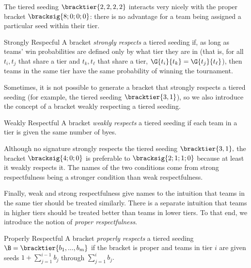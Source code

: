 {    The tiered seeding $\bracktier{2,2,2,2}$ interacts very nicely with the proper bracket $\bracksig{8;0;0;0}$: there is no advantage for a team being assigned a particular seed within their tier.

    \begin{definition}{Strongly Respecful}{}
        A bracket \textit{strongly respects} a tiered seeding if, as long as teams' win probabilities are defined only by what tier they are in (that is, for all $t_i, t_j$ that share a tier and $t_k, t_\ell$ that share a tier, $\G{t_i}{t_k} = \G{t_j}{t_\ell}$), then teams in the same tier have the same probability of winning the tournament.
    \end{definition}

    Sometimes, it is not possible to generate a bracket that strongly respects a tiered seeding (for example, the tiered seeding $\bracktier{3, 1}$), so we also introduce the concept of a bracket weakly respecting a tiered seeding.

    \begin{definition}{Weakly Respectful}{}
        A bracket \textit{weakly respects} a tiered seeding if each team in a tier is given the same number of byes.
    \end{definition}

    Although no signature strongly respects the tiered seeding $\bracktier{3, 1},$ the bracket $\bracksig{4;0;0}$ is preferable to $\bracksig{2;1;1;0}$ because at least it weakly respects it. The names of the two conditions come from strong respectfulness being a stronger condition than weak respectfulness.


    Finally, weak and strong respectfulness give names to the intuition that teams in the same tier should be treated similarly. There is a separate intuition that teams in higher tiers should be treated better than teams in lower tiers. To that end, we introduce the notion of \textit{proper respectfulness}.

    \begin{definition}{Properly Respectful}{}
        A bracket \textit{properly respects} a tiered seeding $\B = \bracktier{b_1, ..., b_m}$ if the bracket is proper and teams in tier $i$ are given seeds $1 + \sum_{j=1}^{i-1} b_j$ through $\sum_{j=1}^{i} b_j.$
    \end{definition}

}
